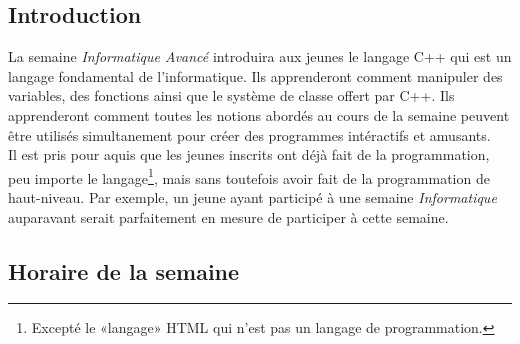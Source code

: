 \documentclass[]{report}
\begin{document}
\begin{adjustwidth}{1.5cm}{0cm}

\subsection*{\Large{Introduction}}
\vspace{-5mm}\makebox[0.917\textwidth]{\hrulefill}\vspace{3mm}

La semaine \textit{Informatique Avancé} introduira aux jeunes le langage C++ qui est un langage fondamental de l'informatique. Ils apprenderont comment manipuler des variables, des fonctions ainsi que le système de classe offert par C++. Ils apprenderont comment 
toutes les notions abordés au cours de la semaine peuvent être utilisés simultanement pour créer des programmes intéractifs et amusants.
\\[6pt]
Il est pris pour aquis que les jeunes inscrits ont déjà fait de la programmation, peu importe le langage\footnote{Excepté le «langage» HTML qui n'est pas un langage de programmation.}, mais sans toutefois avoir fait de la programmation de haut-niveau. Par exemple, un jeune ayant participé à une semaine \textit{Informatique} auparavant serait parfaitement en mesure de participer à cette semaine. 
\subsection*{\Large{Horaire de la semaine}}
\vspace{-5mm}\makebox[0.917\textwidth]{\hrulefill}\vspace{3mm}

\begin{center}
\end{center}
\end{adjustwidth}
\end{document}
